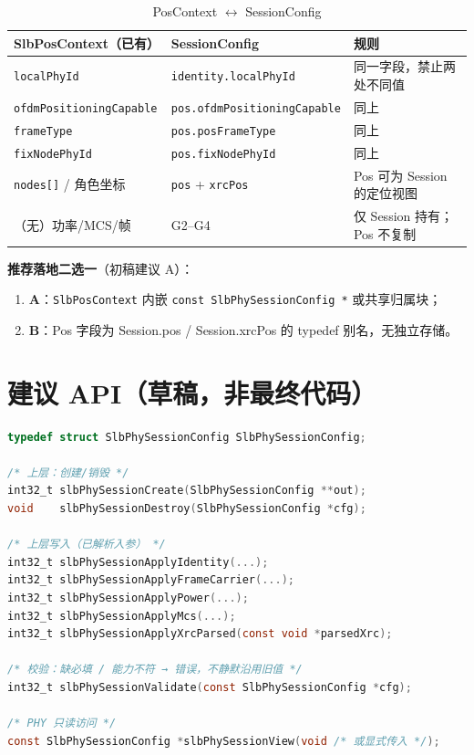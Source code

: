 \documentclass[11pt,a4paper]{ctexart}
\begin{document}
\begin{longtable}{L{4.5cm}L{4.5cm}L{5.2cm}}
\caption{PosContext $\leftrightarrow$ SessionConfig\label{tab:map}} \\
\toprule
\textbf{SlbPosContext（已有）} & \textbf{SessionConfig} & \textbf{规则} \\
\midrule
\texttt{localPhyId} & \texttt{identity.localPhyId} & 同一字段，禁止两处不同值 \\
\texttt{ofdmPositioningCapable} & \texttt{pos.ofdmPositioningCapable} & 同上 \\
\texttt{frameType} & \texttt{pos.posFrameType} & 同上 \\
\texttt{fixNodePhyId} & \texttt{pos.fixNodePhyId} & 同上 \\
\texttt{nodes[]} / 角色坐标 & \texttt{pos} + \texttt{xrcPos} & Pos 可为 Session 的定位视图 \\
（无）功率/MCS/帧 & G2--G4 & 仅 Session 持有；Pos 不复制 \\
\bottomrule
\end{longtable}

\textbf{推荐落地二选一}（初稿建议 A）：
\begin{enumerate}[nosep]
  \item \textbf{A}：\texttt{SlbPosContext} 内嵌 \texttt{const SlbPhySessionConfig *} 或共享归属块；
  \item \textbf{B}：Pos 字段为 Session.pos / Session.xrcPos 的 typedef 别名，无独立存储。
\end{enumerate}

\section{建议 API（草稿，非最终代码）}

\begin{lstlisting}[language=C,caption={SessionConfig 应用入口（示意）}]
typedef struct SlbPhySessionConfig SlbPhySessionConfig;

/* 上层：创建/销毁 */
int32_t slbPhySessionCreate(SlbPhySessionConfig **out);
void    slbPhySessionDestroy(SlbPhySessionConfig *cfg);

/* 上层写入（已解析入参） */
int32_t slbPhySessionApplyIdentity(...);
int32_t slbPhySessionApplyFrameCarrier(...);
int32_t slbPhySessionApplyPower(...);
int32_t slbPhySessionApplyMcs(...);
int32_t slbPhySessionApplyXrcParsed(const void *parsedXrc);

/* 校验：缺必填 / 能力不符 → 错误，不静默沿用旧值 */
int32_t slbPhySessionValidate(const SlbPhySessionConfig *cfg);

/* PHY 只读访问 */
const SlbPhySessionConfig *slbPhySessionView(void /* 或显式传入 */);
\end{lstlisting}
\end{document}
